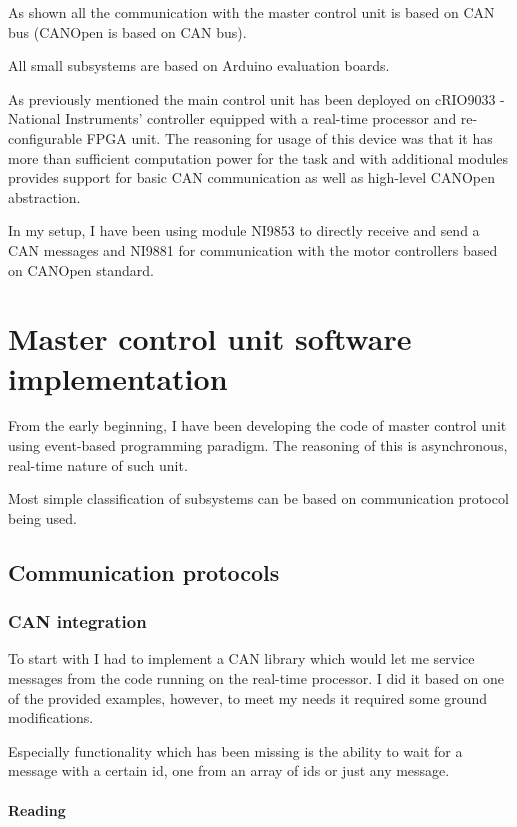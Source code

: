 As shown all the communication with the master control unit is based on CAN bus (CANOpen is based on CAN bus). 






All small subsystems are based on Arduino evaluation boards.




As previously mentioned the main control unit has been deployed on cRIO9033 - National Instruments' controller equipped with a real-time processor and re-configurable FPGA unit. The reasoning for usage of this device was that it has more than sufficient computation power for the task and with additional modules provides support for basic CAN communication as well as high-level CANOpen abstraction.


In my setup, I have been using module NI9853 to directly receive and send a CAN messages and NI9881 for communication with the motor controllers based on CANOpen standard.

\section{Master control unit software implementation}
From the early beginning, I have been developing the code of master control unit using event-based programming paradigm. The reasoning of this is asynchronous, real-time nature of such unit.

Most simple classification of subsystems can be based on communication protocol being used. 

\subsection{Communication protocols}

\subsubsection{CAN integration}
To start with I had to implement a CAN library which would let me service messages from the code running on the real-time processor. I did it based on one of the provided examples, however, to meet my needs it required some ground modifications.

Especially functionality which has been missing is the ability to wait for a message with a certain id, one from an array of ids or just any message. 
\paragraph{Reading}


